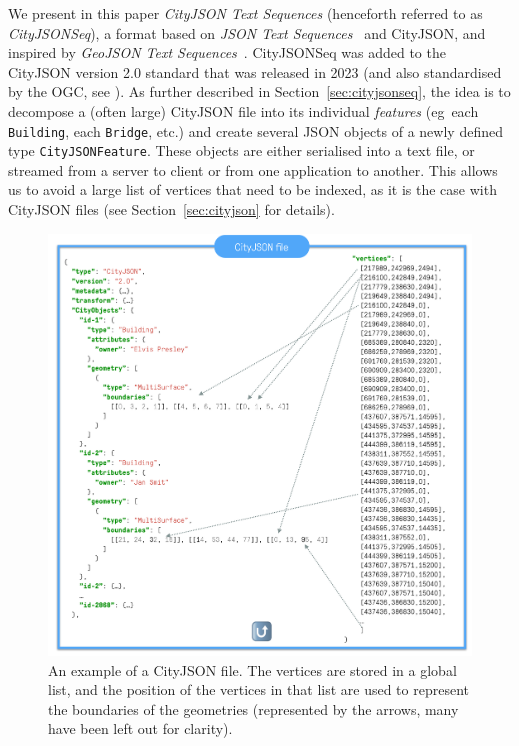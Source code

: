 \documentclass{isprs} %
\newcommand{\eg}{eg}
\begin{document}
%

We present in this paper \emph{CityJSON Text Sequences} (henceforth referred to as \emph{CityJSONSeq}), a format based on \emph{JSON Text Sequences}~\citep{IETF-JSONSeq} and CityJSON, and inspired by \emph{GeoJSON Text Sequences}~\citep{IETF-GeoJSONSeq}. 
CityJSONSeq was added to the CityJSON version 2.0 standard that was released in 2023 (and also standardised by the OGC, see \citet{OGC-CityJSON-v20}).
As further described in Section~\ref{sec:cityjsonseq}, the idea is to decompose a (often large) CityJSON file into its individual \emph{features} (\eg\ each \texttt{Building}, each \texttt{Bridge}, etc.) and create several JSON objects of a newly defined type \texttt{CityJSONFeature}.
These objects are either serialised into a text file, or streamed from a server to client or from one application to another.
This allows us to avoid a large list of vertices that need to be indexed, as it is the case with CityJSON files (see Section~\ref{sec:cityjson} for details).
\begin{figure}
  \centering
  \includegraphics[width=\linewidth]{figs/cj_idea}
  \caption{An example of a CityJSON file. The vertices are stored in a global list, and the position of the vertices in that list are used to represent the boundaries of the geometries (represented by the arrows, many have been left out for clarity).}%
\label{fig:cj_idea}
\end{figure}
\end{document}
